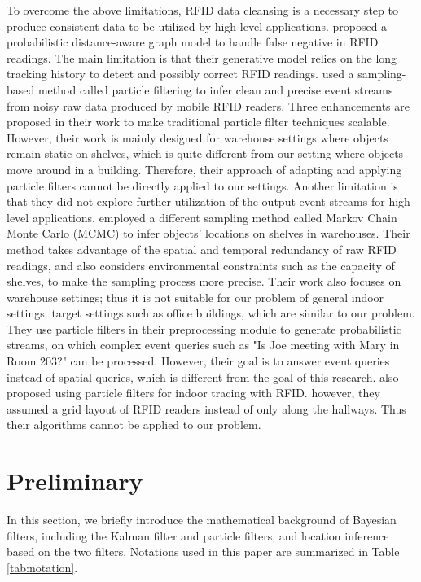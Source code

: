\documentclass[12pt]{report}
\begin{document}
To overcome the above limitations, RFID data cleansing is a
necessary step to produce consistent data to be utilized by
high-level applications. \cite{baba2014-handling} proposed a
probabilistic distance-aware graph model to handle false negative
in RFID readings.  The main limitation is that their generative
model relies on the long tracking history to detect and possibly
correct RFID readings.  \cite{tran2009-probabilistic} used a
sampling-based method called particle filtering to infer clean and
precise event streams from noisy raw data produced by mobile RFID
readers.  Three enhancements are proposed in their work to make
traditional particle filter techniques scalable.  However, their
work is mainly designed for warehouse settings where objects remain
static on shelves, which is quite different from our setting where
objects move around in a building.  Therefore, their approach of
adapting and applying particle filters cannot be directly applied
to our settings.  Another limitation is that they did not explore
further utilization of the output event streams for high-level
applications. \cite{ku2013-bayesian} employed a different sampling
method called Markov Chain Monte Carlo (MCMC) to infer objects'
locations on shelves in warehouses.  Their method takes advantage
of the spatial and temporal redundancy of raw RFID readings, and
also considers environmental constraints such as the capacity of
shelves, to make the sampling process more precise.  Their work
also focuses on warehouse settings; thus it is not suitable for our
problem of general indoor settings.
\cite{re2008-event,welbourne2008-cascadia,letchner2009-access} target
settings such as office buildings, which are similar to our
problem.  They use particle filters in their preprocessing module
to generate probabilistic streams, on which complex event queries
such as "Is Joe meeting with Mary in Room 203?" can be processed.
However, their goal is to answer event queries instead of spatial
queries, which is different from the goal of this research.
\cite{geng2014-indoor} also proposed using particle filters for
indoor tracing with RFID.  however, they assumed a grid layout of
RFID readers instead of only along the hallways.  Thus their
algorithms cannot be applied to our problem.

\part{Preliminary}
\label{sec:preliminary}
In this section, we briefly introduce the mathematical background of
Bayesian filters, including the Kalman filter and particle filters,
and location inference based on the two filters.  Notations used in
this paper are summarized in Table \ref{tab:notation}.
\end{document}

